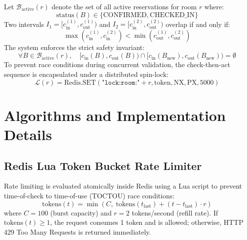 \documentclass[11pt,a4paper]{article}
\begin{document}
Let $\mathcal{B}_{\text{active}}(r)$ denote the set of all active reservations for room $r$ where:
\begin{equation}
\text{status}(B) \in \{\text{CONFIRMED}, \text{CHECKED\_IN}\}
\end{equation}
Two intervals $I_1 = [c_{\text{in}}^{(1)}, c_{\text{out}}^{(1)})$ and $I_2 = [c_{\text{in}}^{(2)}, c_{\text{out}}^{(2)})$ overlap if and only if:
\begin{equation}
\max(c_{\text{in}}^{(1)}, c_{\text{in}}^{(2)}) < \min(c_{\text{out}}^{(1)}, c_{\text{out}}^{(2)})
\end{equation}
The system enforces the strict safety invariant:
\begin{equation}
\forall B \in \mathcal{B}_{\text{active}}(r), \quad [c_{\text{in}}(B), c_{\text{out}}(B)) \cap [c_{\text{in}}(B_{\text{new}}), c_{\text{out}}(B_{\text{new}})) = \emptyset
\end{equation}
To prevent race conditions during concurrent validation, the check-then-act sequence is encapsulated under a distributed spin-lock:
\begin{equation}
\mathcal{L}(r) = \text{Redis.SET}(\texttt{"lock:room:"} + r, \text{token}, \text{NX}, \text{PX}, 5000)
\end{equation}

\section{Algorithms and Implementation Details}

\subsection{Redis Lua Token Bucket Rate Limiter}
Rate limiting is evaluated atomically inside Redis using a Lua script to prevent time-of-check to time-of-use (TOCTOU) race conditions:
\begin{equation}
\text{tokens}(t) = \min\left(C, \; \text{tokens}(t_{\text{last}}) + (t - t_{\text{last}}) \cdot r\right)
\end{equation}
where $C = 100$ (burst capacity) and $r = 2$ tokens/second (refill rate). If $\text{tokens}(t) \ge 1$, the request consumes 1 token and is allowed; otherwise, HTTP 429 Too Many Requests is returned immediately.
\end{document}
